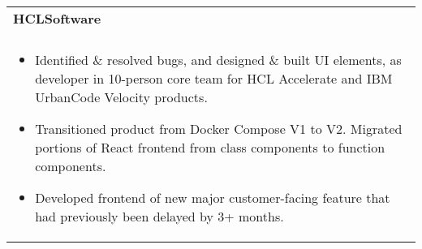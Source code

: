 \documentclass[letterpaper,10pt]{article} %
\begin{document}
\begin{tabular*}{\linewidth}{@{\extracolsep{\fill}} lr }
\textbf{HCLSoftware} & \scriptsize\bfseries\color{sectioncolour}{Remote}\\
\footnotesize\bfseries\color{sectioncolour}{Software Engineer Intern} & \scriptsize\bfseries\color{sectioncolour}{May 2023 - August 2023}\\
\multicolumn{2}{p{\linewidth}}{
    \scriptsize{\vspace{-0.1in}\begin{itemize}
        \item Identified \& resolved bugs, and designed \& built UI elements, as developer in 10-person core team for HCL Accelerate and IBM UrbanCode Velocity products.
        \item Transitioned product from Docker Compose V1 to V2. Migrated portions of React frontend from class components to function components.
        \item Developed frontend of new major customer-facing feature that had previously been delayed by 3+ months.
    \end{itemize}\vspace{-0.1in}}
}\\


\end{tabular*}
\end{document}
